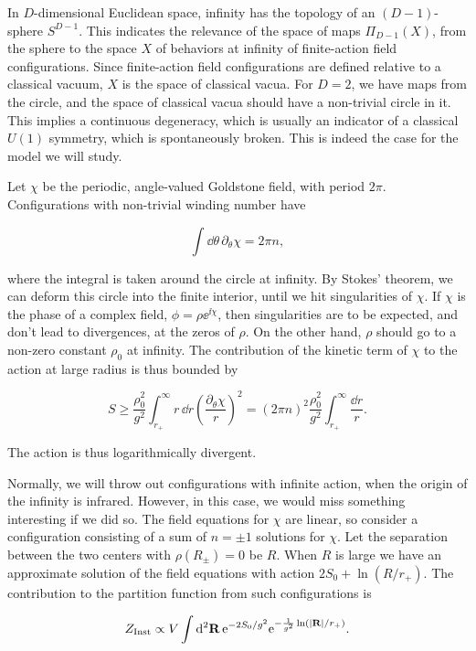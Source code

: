 In $D$-dimensional Euclidean space, infinity has the topology of an
$(D-1)$-sphere $S^{D-1}$. This indicates the relevance of the space of maps
$\Pi_{D-1}(X)$, from the sphere to the space $X$ of behaviors at infinity of
finite-action field configurations. Since finite-action field configurations are
defined relative to a classical vacuum, $X$ is the space of classical vacua.
For $D=2$, we have maps from the circle, and the space of classical vacua should
have a non-trivial circle in it. This implies a continuous degeneracy, which is
usually an indicator of a classical $U(1)$ symmetry, which is spontaneously
broken. This is indeed the case for the model we will study.

Let $\chi$ be the periodic, angle-valued Goldstone field, with period $2\pi$.
Configurations with non-trivial winding number have

\[
  \int\dd\theta\,\partial_\theta\chi=2\pi n,
\]

where the integral is taken around the circle at infinity. By Stokes' theorem,
we can deform this circle into the finite interior, until we hit singularities of
$\chi$. If $\chi$ is the phase of a complex field,
$\phi=\rho\ee^{\ii\chi}$, then singularities are to be expected, and don't
lead to divergences, at the zeros of $\rho$. On the other hand, $\rho$ should go
to a non-zero constant $\rho_0$ at infinity. The contribution of the kinetic
term of $\chi$ to the action at large radius is thus bounded by

\[
  S\geq\frac{\rho_0^2}{g^2}\int_{r_+}^{\infty}r\,\dd r
  \left(\frac{\partial_\theta\chi}{r}\right)^2
  =(2\pi n)^2\frac{\rho_0^2}{g^2}
  \int_{r_+}^{\infty}\frac{\dd r}{r}.
\]

The action is thus logarithmically divergent.

Normally, we will throw out configurations with infinite action, when the origin
of the infinity is infrared. However, in this case, we would miss something
interesting if we did so. The field equations for $\chi$ are linear, so consider
a configuration consisting of a sum of $n=\pm1$ solutions for $\chi$. Let the
separation between the two centers with $\rho(R_\pm)=0$ be $R$. When $R$ is
large we have an approximate solution of the field equations with action
$2S_0+\ln(R/r_+)$. The contribution to the partition function from such
configurations is

\[
  Z_{\rm Inst}\propto V\int\mathop{}\!\mathrm{d}^2\mathbf R\,
  \mathrm{e}^{-2S_0/g^2}\mathrm{e}^{-\frac{1}{g^2}\ln(|\mathbf R|/r_+)}.
\]

